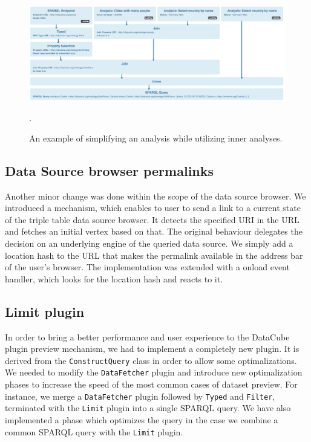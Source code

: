 \begin{figure}
	\centering
	\includegraphics[width=140mm]{img/inner-example-simpler.png}
	\caption{An example of simplifying an analysis while utilizing inner analyses.}.
	\label{fig:inner-example-simpler}
\end{figure}

\subsection{Data Source browser permalinks}
Another minor change was done within the scope of the data source browser.
We introduced a mechanism, which enables to user to send a link to a current 
state of the triple table data source browser. It detects the specified URI in 
the URL and fetches an initial vertex based on that. The original behaviour delegates 
the decision on an underlying engine of the queried data source. We simply add a 
location hash to the URL that makes the permalink available in the address bar 
of the user's browser. The implementation was extended with a onload event 
handler, which looks for the location hash and reacts to it.

\subsection{Limit plugin}
In order to bring a better performance and user experience to the DataCube plugin
preview mechanism, we had to implement a completely new plugin. It is derived 
from the \texttt{ConstructQuery} class in order to allow some optimalizations. 
We needed to modify the \texttt{DataFetcher} plugin and introduce new 
optimalization phases to increase the speed of the most common cases of dataset 
preview. For instance, we merge a \texttt{DataFetcher} plugin followed by 
\texttt{Typed} and \texttt{Filter}, terminated with the \texttt{Limit} plugin 
into a single SPARQL query. We have also implemented a phase which optimizes
the query in the case we combine a common SPARQL query with the \texttt{Limit} plugin.
